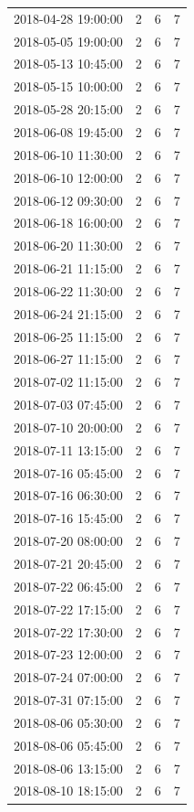 \begin{tabular}{lrrr}
2018-04-28 19:00:00 & 2 & 6 & 7 \\
2018-05-05 19:00:00 & 2 & 6 & 7 \\
2018-05-13 10:45:00 & 2 & 6 & 7 \\
2018-05-15 10:00:00 & 2 & 6 & 7 \\
2018-05-28 20:15:00 & 2 & 6 & 7 \\
2018-06-08 19:45:00 & 2 & 6 & 7 \\
2018-06-10 11:30:00 & 2 & 6 & 7 \\
2018-06-10 12:00:00 & 2 & 6 & 7 \\
2018-06-12 09:30:00 & 2 & 6 & 7 \\
2018-06-18 16:00:00 & 2 & 6 & 7 \\
2018-06-20 11:30:00 & 2 & 6 & 7 \\
2018-06-21 11:15:00 & 2 & 6 & 7 \\
2018-06-22 11:30:00 & 2 & 6 & 7 \\
2018-06-24 21:15:00 & 2 & 6 & 7 \\
2018-06-25 11:15:00 & 2 & 6 & 7 \\
2018-06-27 11:15:00 & 2 & 6 & 7 \\
2018-07-02 11:15:00 & 2 & 6 & 7 \\
2018-07-03 07:45:00 & 2 & 6 & 7 \\
2018-07-10 20:00:00 & 2 & 6 & 7 \\
2018-07-11 13:15:00 & 2 & 6 & 7 \\
2018-07-16 05:45:00 & 2 & 6 & 7 \\
2018-07-16 06:30:00 & 2 & 6 & 7 \\
2018-07-16 15:45:00 & 2 & 6 & 7 \\
2018-07-20 08:00:00 & 2 & 6 & 7 \\
2018-07-21 20:45:00 & 2 & 6 & 7 \\
2018-07-22 06:45:00 & 2 & 6 & 7 \\
2018-07-22 17:15:00 & 2 & 6 & 7 \\
2018-07-22 17:30:00 & 2 & 6 & 7 \\
2018-07-23 12:00:00 & 2 & 6 & 7 \\
2018-07-24 07:00:00 & 2 & 6 & 7 \\
2018-07-31 07:15:00 & 2 & 6 & 7 \\
2018-08-06 05:30:00 & 2 & 6 & 7 \\
2018-08-06 05:45:00 & 2 & 6 & 7 \\
2018-08-06 13:15:00 & 2 & 6 & 7 \\
2018-08-10 18:15:00 & 2 & 6 & 7 \\

\end{tabular}
